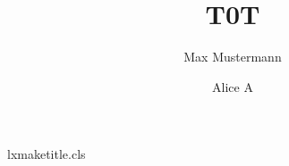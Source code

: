 \begin{filecontents*}[overwrite]{lxmaketitle.cls}
\renewcommand\maketitle{\par}
\end{filecontents*}
\documentclass{lxmaketitle}

\title{T0}\author{Max Mustermann}\maketitle
\title{T}
\author{Alice A}
\maketitle
Body.

